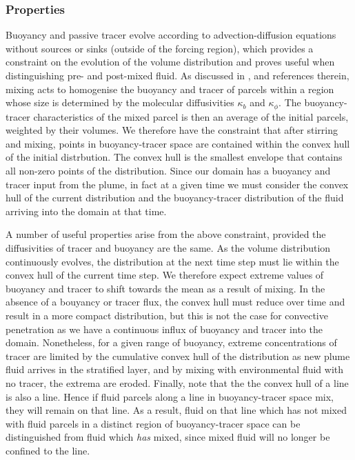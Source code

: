\documentclass[a4paper]{article}
\begin{document}
\subsubsection{Properties}
\label{sec:PDFproperties}
Buoyancy and passive tracer evolve according to advection-diffusion equations without sources or sinks
(outside of the forcing region), which provides a constraint on the evolution of the volume distribution and
proves useful when distinguishing pre- and post-mixed fluid. As discussed in \citet{penney2020},
\citet{plumb2007} and references therein, mixing acts to homogenise the buoyancy and tracer of parcels within
a region whose size is determined by the molecular diffusivities $\kappa_b$ and $\kappa_{\phi}$. The
buoyancy-tracer characteristics of the mixed parcel is then an average of the initial parcels, weighted by
their volumes. We therefore have the constraint that after stirring and mixing, points in buoyancy-tracer
space are contained within the convex hull of the initial distrbution. The convex hull is the smallest
envelope that contains all non-zero points of the distribution. Since our domain has a buoyancy and tracer
input from the plume, in fact at a given time we must consider the convex hull of the current distribution and
the buoyancy-tracer distribution of the fluid arriving into the domain at that time.

A number of useful properties arise from the above constraint, provided the diffusivities of tracer and
buoyancy are the same. As the volume distribution continuously evolves, the distribution at the next time step must lie
within the convex hull of the current time step. We therefore expect extreme values of buoyancy and tracer to
shift towards the mean as a result of mixing. In the absence of a bouyancy or tracer flux, the convex hull
must reduce over time and result in a more compact distribution, but this is not the case for convective
penetration as we have a continuous influx of buoyancy and tracer into the domain. Nonetheless, for a given
range of buoyancy, extreme concentrations of tracer are limited by the cumulative convex hull of the
distribution as new plume fluid arrives in the stratified layer, and by mixing with environmental fluid with
no tracer, the extrema are eroded. Finally, note that the the convex hull of a line is also a line.  Hence if
fluid parcels along a line in buoyancy-tracer space mix, they will remain on that line. As a result, fluid on
that line which has not mixed with fluid parcels in a distinct region of buoyancy-tracer space can be
distinguished from fluid which \emph{has} mixed, since mixed fluid will no longer be confined to the line.
\end{document}
